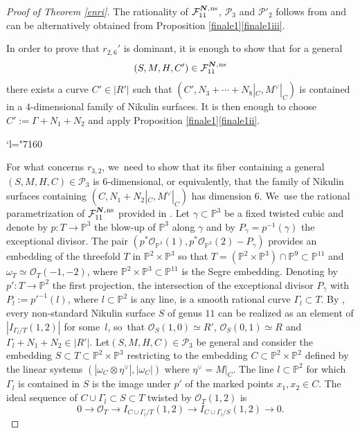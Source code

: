 \documentclass[JEP,XML,SOM,Unicode,NoEqCountersInSection,published]{cedram}
\newcommand{\Changel}{\mathcode`l="7160}
\newcommand{\ns}{{\mkern1mu\mathrm{ns}}}
\newcommand{\bN}{\boldsymbol{N}}
\theoremstyle{plain}
\theoremstyle{definition}
\newcommand\PP{{\mathbb P}}
\newcommand\F{{\mathcal F}}
\renewcommand\O{{\mathcal O}}
\renewcommand\P{{\mathcal P}}
\begin{document}
\begin{proof}[Proof of Theorem \ref{enri}]
The rationality of $\F_{11}^{\bN,\ns}$, $\P_{3}$ and $\P'_{2}$ follows from \cite[Th.\,1.2]{KLV2} and can be alternatively obtained from Proposition \ref{finale1}\eqref{finale1iii}.

In order to prove that $r_{2,6}'$ is dominant, it is enough to show that for a general\vspace*{-3pt}
\[
(S,M,H,C')\in \F_{11}^{\bN,\ns}
\]
there exists a curve $C'\in |R'|$ such that $(C',N_3+\cdots+N_8|_C,M^\vee|_C)$ is contained in a $4$-dimensional family of Nikulin surfaces. It is then enough to choose $C':=\Gamma+N_1+N_2$ and apply Proposition \ref{finale1}\eqref{finale1ii}.

\Changel

For what concerns $r_{3,2}$, we~need to show that its fiber containing a general $(S,M,H,C)\in \P_{3}$ is $6$-dimensional, or equivalently, that the family of Nikulin surfaces containing $(C,N_1+N_2|_C,M^\vee|_C)$ has dimension $6$. We~use the rational parametrization of $\F_{11}^{\bN,\ns}$ provided in \cite[\S 5]{KLV2}. Let $\gamma\subset \PP^3$ be a fixed twisted cubic and denote by \hbox{$p:T\to \PP^3$} the blow-up of $\PP^3$ along $\gamma$ and by $P_\gamma=p^{-1}(\gamma)$ the exceptional divisor. The pair $(p^*\O_{\PP^3}(1), p^*\O_{\PP^3}(2)-P_\gamma)$ provides an embedding of the threefold $T$ in $\PP^2\times \PP^3$ so that $T=(\PP^2\times \PP^3)\cap \PP^9\subset \PP^{11}$ and $\omega_T\simeq \mathcal O_T(-1,-2)$, where $\PP^2\times \PP^3\subset\PP^{11}$ is the Segre embedding. Denoting by $p':T\to \PP^2$ the first projection, the intersection of the exceptional divisor $P_\gamma$ with $P_l:=p'^{-1}(l)$, where $l\subset\PP^2$ is any line, is a smooth rational curve $\Gamma_l\subset T$. By \cite[Lem.\,5.3]{KLV2}, every non-standard Nikulin surface $S$ of genus $11$ can be realized as an element of $|I_{\Gamma_l/T}(1,2)|$ for some~$l$, so~that $\O_S(1,0)\simeq R'$, $\O_S(0,1)\simeq R$ and $\Gamma_l+N_1+N_2\in |R'|$. Let$(S,M,H,C)\in \P_{3}$ be general and consider the embedding $ S\subset T\subset \PP^2\times \PP^3$ restricting to the embedding $C\subset \PP^2\times \PP^2$ defined by the linear systems $(|\omega_C\otimes \eta^\vee|, |\omega_C|)$ where $\eta^\vee=M|_C$. The line $l\subset \PP^2$ for which $\Gamma_l$ is contained in $S$ is the image under $p'$ of the marked points $x_1,x_2\in C$. The ideal sequence of $C\cup\Gamma_l\subset S\subset T$ twisted by $\O_T(1,2)$ is\vspace*{-3pt}
\[
0\to \O_T\to I_{C\cup \Gamma_l/T}(1,2)\to I_{C\cup \Gamma_l/S}(1,2)\to 0.
\]
\end{proof}
\end{document}
